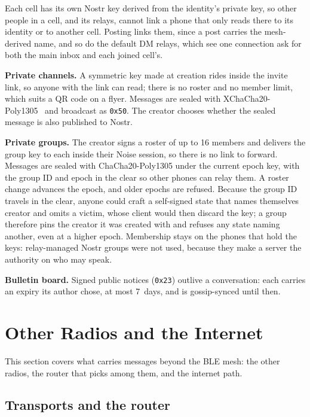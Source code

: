 \documentclass[conference]{IEEEtran}
\newcommand{\hx}[1]{\texttt{0x#1}}
\begin{document}
Each cell has its own Nostr key derived from the identity's private key, so other people in a cell, and its relays, cannot link a phone that only reads there to its identity or to another cell. Posting links them, since a post carries the mesh-derived name, and so do the default DM relays, which see one connection ask for both the main inbox and each joined cell's.

\textbf{Private channels.} A symmetric key made at creation rides inside the invite link, so anyone with the link can read; there is no roster and no member limit, which suits a QR code on a flyer. Messages are sealed with XChaCha20-Poly1305~\cite{xchacha} and broadcast as \hx{50}. The creator chooses whether the sealed message is also published to Nostr.

\textbf{Private groups.} The creator signs a roster of up to 16 members and delivers the group key to each inside their Noise session, so there is no link to forward. Messages are sealed with ChaCha20-Poly1305 under the current epoch key, with the group ID and epoch in the clear so other phones can relay them. A roster change advances the epoch, and older epochs are refused. Because the group ID travels in the clear, anyone could craft a self-signed state that names themselves creator and omits a victim, whose client would then discard the key; a group therefore pins the creator it was created with and refuses any state naming another, even at a higher epoch. Membership stays on the phones that hold the keys: relay-managed Nostr groups were not used, because they make a server the authority on who may speak.

\textbf{Bulletin board.} Signed public notices (\hx{23}) outlive a conversation: each carries an expiry its author chose, at most 7~days, and is gossip-synced until then.

\section{Other Radios and the Internet}
\label{sec:beyond}

This section covers what carries messages beyond the BLE mesh: the other radios, the router that picks among them, and the internet path.

\subsection{Transports and the router}
\label{sec:transports}
\end{document}
